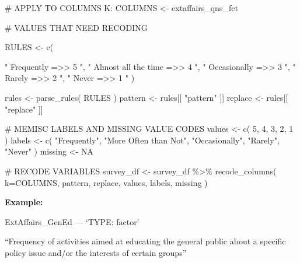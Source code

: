 \documentclass[
  letterpaper,
]{scrbook}
\newenvironment{Shaded}{\begin{snugshade}}{\end{snugshade}}
\newcommand{\AttributeTok}[1]{\textcolor[rgb]{0.40,0.45,0.13}{#1}}
\newcommand{\CommentTok}[1]{\textcolor[rgb]{0.37,0.37,0.37}{#1}}
\newcommand{\ConstantTok}[1]{\textcolor[rgb]{0.56,0.35,0.01}{#1}}
\newcommand{\DecValTok}[1]{\textcolor[rgb]{0.68,0.00,0.00}{#1}}
\newcommand{\FunctionTok}[1]{\textcolor[rgb]{0.28,0.35,0.67}{#1}}
\newcommand{\NormalTok}[1]{\textcolor[rgb]{0.00,0.23,0.31}{#1}}
\newcommand{\OtherTok}[1]{\textcolor[rgb]{0.00,0.23,0.31}{#1}}
\newcommand{\SpecialCharTok}[1]{\textcolor[rgb]{0.37,0.37,0.37}{#1}}
\newcommand{\StringTok}[1]{\textcolor[rgb]{0.13,0.47,0.30}{#1}}
\begin{document}
\begin{Shaded}
\begin{Highlighting}[]
\CommentTok{\# APPLY TO COLUMNS K:}
\NormalTok{COLUMNS }\OtherTok{\textless{}{-}}\NormalTok{  extaffairs\_qns\_fct}

\CommentTok{\# VALUES THAT NEED RECODING}

\NormalTok{RULES }\OtherTok{\textless{}{-}} \FunctionTok{c}\NormalTok{(    }

     \StringTok{"             Frequently    =\textgreater{}\textgreater{}     5   "}\NormalTok{,}
     \StringTok{"    Almost all the time    =\textgreater{}\textgreater{}     4   "}\NormalTok{,}
     \StringTok{"           Occasionally    =\textgreater{}\textgreater{}     3   "}\NormalTok{,}
     \StringTok{"                 Rarely    =\textgreater{}\textgreater{}     2   "}\NormalTok{,}
     \StringTok{"                  Never    =\textgreater{}\textgreater{}     1   "}\NormalTok{   )}
     
\NormalTok{rules }\OtherTok{\textless{}{-}} \FunctionTok{parse\_rules}\NormalTok{( RULES )          }
\NormalTok{pattern }\OtherTok{\textless{}{-}}\NormalTok{ rules[[ }\StringTok{"pattern"}\NormalTok{ ]]}
\NormalTok{replace }\OtherTok{\textless{}{-}}\NormalTok{ rules[[ }\StringTok{"replace"}\NormalTok{ ]]}

\CommentTok{\# MEMISC LABELS AND MISSING VALUE CODES }
\NormalTok{values  }\OtherTok{\textless{}{-}} \FunctionTok{c}\NormalTok{( }\DecValTok{5}\NormalTok{, }\DecValTok{4}\NormalTok{, }\DecValTok{3}\NormalTok{, }\DecValTok{2}\NormalTok{, }\DecValTok{1}\NormalTok{ )}
\NormalTok{labels  }\OtherTok{\textless{}{-}} \FunctionTok{c}\NormalTok{( }\StringTok{"Frequently"}\NormalTok{, }\StringTok{"More Often than Not"}\NormalTok{, }
              \StringTok{"Occasionally"}\NormalTok{, }\StringTok{"Rarely"}\NormalTok{, }\StringTok{"Never"}\NormalTok{  )}
\NormalTok{missing }\OtherTok{\textless{}{-}} \ConstantTok{NA}

\CommentTok{\# RECODE VARIABLES }
\NormalTok{survey\_df }\OtherTok{\textless{}{-}} 
\NormalTok{  survey\_df }\SpecialCharTok{\%\textgreater{}\%} 
  \FunctionTok{recode\_columns}\NormalTok{( }\AttributeTok{k=}\NormalTok{COLUMNS, pattern, replace, values, labels, missing )}
\end{Highlighting}
\end{Shaded}

\textbf{Example:}

ExtAffairs\_GenEd --- {`TYPE: factor'}

``Frequency of activities aimed at educating the general public about a
specific policy issue and/or the interests of certain groups''
\end{document}
